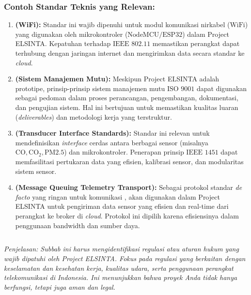 \documentclass{elsinta}
\begin{document}
\subsubsection*{Contoh Standar Teknis yang Relevan:}
\begin{enumerate}
    \item \textbf{ (WiFi):} Standar ini wajib dipenuhi untuk modul komunikasi nirkabel ($\text{WiFi}$) yang digunakan oleh mikrokontroler ($\text{NodeMCU/ESP32}$) dalam Project ELSINTA. Kepatuhan terhadap $\text{IEEE 802.11}$ memastikan perangkat dapat terhubung dengan jaringan internet dan mengirimkan data secara standar ke \emph{cloud}.
    \item \textbf{ (Sistem Manajemen Mutu):} Meskipun Project ELSINTA adalah prototipe, prinsip-prinsip sistem manajemen mutu $\text{ISO 9001}$ dapat digunakan sebagai pedoman dalam proses perancangan, pengembangan, dokumentasi, dan pengujian sistem. Hal ini bertujuan untuk memastikan kualitas luaran (\emph{deliverables}) dan metodologi kerja yang terstruktur.
    \item \textbf{ (Transducer Interface Standards):} Standar ini relevan untuk mendefinisikan \emph{interface} cerdas antara berbagai sensor (misalnya $\text{CO}, \text{CO}_2, \text{PM2.5}$) dan mikrokontroler. Penerapan prinsip $\text{IEEE 1451}$ dapat memfasilitasi pertukaran data yang efisien, kalibrasi sensor, dan modularitas sistem sensor.
    \item \textbf{ (Message Queuing Telemetry Transport):} Sebagai protokol standar \emph{de facto} yang ringan untuk komunikasi ,  akan digunakan dalam Project ELSINTA untuk pengiriman data sensor yang efisien dan real-time dari perangkat ke broker di \emph{cloud}. Protokol ini dipilih karena efisiensinya dalam penggunaan bandwidth dan sumber daya.
\end{enumerate}

\subsection{\RegulationsTitle}
\textit{Penjelasan: Subbab ini harus mengidentifikasi regulasi atau aturan hukum yang wajib dipatuhi oleh Project ELSINTA. Fokus pada regulasi yang berkaitan dengan keselamatan dan kesehatan kerja, kualitas udara, serta penggunaan perangkat telekomunikasi di Indonesia. Ini menunjukkan bahwa proyek Anda tidak hanya berfungsi, tetapi juga aman dan legal.}
\end{document}
